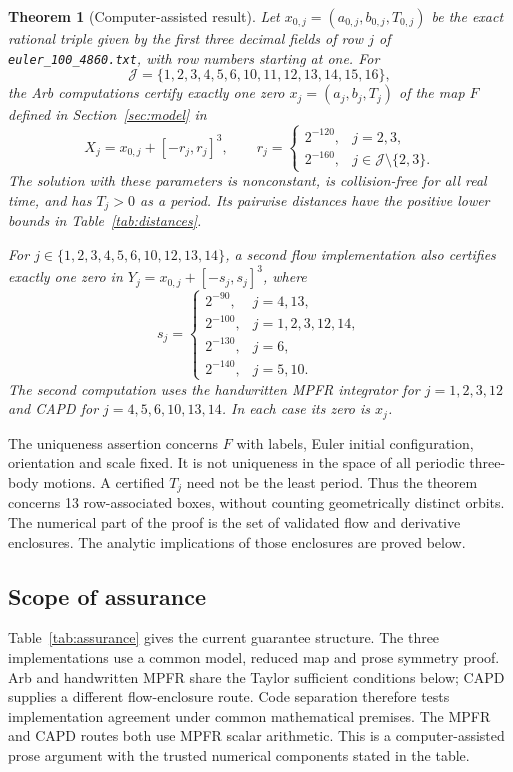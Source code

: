 \documentclass[10pt,a4paper]{article}
\newtheorem{theorem}{Theorem}
\theoremstyle{remark}
\begin{document}
\begin{theorem}[Computer-assisted result]
\label{thm:result}
Let $x_{0,j}=(a_{0,j},b_{0,j},T_{0,j})$ be the exact rational triple given
by the first three decimal fields of row $j$ of
\texttt{euler\_100\_4860.txt}, with row numbers starting at one. For
\[
 \mathcal J=\{1,2,3,4,5,6,10,11,12,13,14,15,16\},
\]
the Arb computations certify exactly one zero $x_j=(a_j,b_j,T_j)$ of
the map $F$ defined in Section~\ref{sec:model} in
\[
 X_j=x_{0,j}+[-r_j,r_j]^3,\qquad
 r_j=\begin{cases}2^{-120},&j=2,3,\\2^{-160},&j\in\mathcal J\setminus\{2,3\}.
 \end{cases}
\]
The solution with these parameters is nonconstant, is collision-free for
all real time, and has $T_j>0$ as a period. Its pairwise distances have
the positive lower bounds in Table~\ref{tab:distances}.

For $j\in\{1,2,3,4,5,6,10,12,13,14\}$, a second flow implementation also
certifies exactly one zero in $Y_j=x_{0,j}+[-s_j,s_j]^3$, where
\[
 s_j=\begin{cases}
 2^{-90},&j=4,13,\\
 2^{-100},&j=1,2,3,12,14,\\
 2^{-130},&j=6,\\
 2^{-140},&j=5,10.
 \end{cases}
\]
The second computation uses the handwritten MPFR integrator for
$j=1,2,3,12$ and CAPD for $j=4,5,6,10,13,14$. In each case its zero is $x_j$.
\end{theorem}

The uniqueness assertion concerns $F$ with labels, Euler initial
configuration, orientation and scale fixed. It is not uniqueness in the
space of all periodic three-body motions. A certified $T_j$ need not be
the least period. Thus the theorem concerns 13 row-associated boxes,
without counting geometrically distinct orbits. The numerical part of
the proof is the set of validated flow and derivative enclosures. The
analytic implications of those enclosures are proved below.

\subsection{Scope of assurance}
\label{sec:assurance}
Table~\ref{tab:assurance} gives the current guarantee structure. The
three implementations use a common model, reduced map and prose
symmetry proof. Arb and handwritten MPFR share the Taylor sufficient
conditions below; CAPD supplies a different flow-enclosure route.
Code separation therefore tests implementation agreement under common
mathematical premises. The MPFR and CAPD routes both use MPFR scalar
arithmetic. This is a computer-assisted prose argument with the trusted
numerical components stated in the table.
\end{document}
